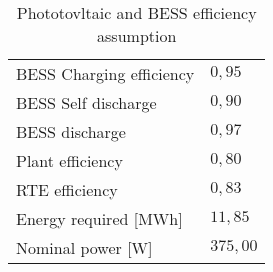 \begin{table}
\centering
\begin{tabular}{|ll|}
\hline
\rowcolor{bluepoli!40}\multicolumn{2}{|l|}{\textbf{Efficiency assumption}}                 \\ \hline
\multicolumn{1}{|l|}{BESS Charging   efficiency} & \textbf{$0,95$}   \\ \hline
\multicolumn{1}{|l|}{BESS Self discharge}        & \textbf{$0,90$}   \\ \hline
\multicolumn{1}{|l|}{BESS discharge}             & \textbf{$0,97$}   \\ \hline
\multicolumn{1}{|l|}{Plant efficiency}           & \textbf{$0,80$}   \\ \hline
\multicolumn{1}{|l|}{RTE efficiency}             & \textbf{$0,83$}   \\ \hline
\multicolumn{1}{|l|}{Energy required {[}MWh{]}}  & \textbf{$11,85$}  \\ \hline
\multicolumn{1}{|l|}{Nominal power {[}W{]}}      & \textbf{$375,00$} \\ \hline
\end{tabular}
\caption{Phototovltaic and BESS efficiency assumption}
\label{tab:pvbessass}
\end{table}